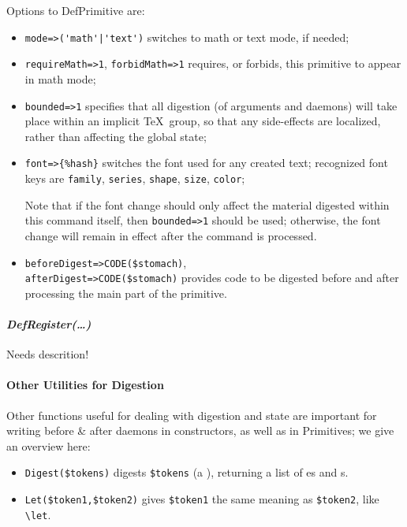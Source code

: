 \documentclass{book}
\newcommand{\ltxcode}{\lstinline[style=inlinelatexml]}
\begin{document}
Options to DefPrimitive are:
\begin{itemize}
\item \ltxcode.mode=>('math'|'text'). switches to math or text mode, if needed;
\item \ltxcode|requireMath=>1|, \ltxcode|forbidMath=>1| requires, or forbids,
  this primitive to appear in math mode;
\item \ltxcode|bounded=>1| specifies that all digestion (of arguments and daemons)
  will take place within an implicit \TeX\ group, so that any side-effects
  are localized, rather than affecting the global state;
\item \ltxcode|font=>{%
  switches the font used for any created text;
  recognized font keys are \texttt{family}, \texttt{series}, \texttt{shape}, \texttt{size}, \texttt{color};
  
  Note that if the font change should only affect the material digested within this
  command itself, then \ltxcode|bounded=>1| should be used; otherwise, the font
  change will remain in effect after the command is processed.
\item \ltxcode|beforeDigest=>CODE($stomach)|,\\
      \ltxcode|afterDigest=>CODE($stomach)|
  provides code to be digested before and after processing
  the main part of the primitive.
\end{itemize}

\paragraph[DefRegister]{%
    \textit{DefRegister(\ldots)}}
Needs descrition!

\paragraph[Other]{Other Utilities for Digestion}

Other functions useful for dealing with digestion and state are important for
writing before \& after daemons in constructors, as well as in Primitives;
we give an overview here:
\begin{itemize}
\item \ltxcode|Digest($tokens)|
digests \ltxcode|$tokens| (a ), returning a list of es and s.
\item \ltxcode|Let($token1,$token2)| gives \ltxcode|$token1| the same meaning as \ltxcode|$token2|,
 like \verb|\let|.
\end{itemize}
\end{document}
